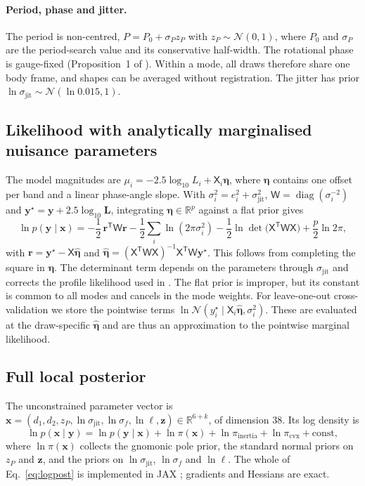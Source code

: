 \documentclass[11pt,a4paper]{article}
\theoremstyle{remark}
\newcommand{\vect}[1]{\bm{#1}}
\newcommand{\R}{\mathbb{R}}
\newcommand{\T}{^{\mathsf T}}
\DeclareMathOperator{\diag}{diag}
\begin{document}
\paragraph{Period, phase and jitter.} The period is non-centred, $P=P_0+\sigma_P z_P$ with
$z_P\sim\mathcal N(0,1)$, where $P_0$ and $\sigma_P$ are the period-search value and its conservative
half-width. The rotational phase is gauge-fixed (Proposition~1 of \citealp{lcinv_convex2026}). Within a
mode, all draws therefore share one body frame, and shapes can be averaged without registration. The
jitter has prior $\ln\sigma_{\mathrm{jit}}\sim\mathcal N(\ln0.015,1)$.

\subsection{Likelihood with analytically marginalised nuisance parameters}
\label{sec:likelihood}
The model magnitudes are $\mu_i=-2.5\log_{10}L_i+\mathsf X_i\vect\eta$, where $\vect\eta$ contains one
offset per band and a linear phase-angle slope. With $\sigma_i^2=e_i^2+\sigma_{\mathrm{jit}}^2$,
$\mathsf W=\diag(\sigma_i^{-2})$ and $\vect y^\star=\vect y+2.5\log_{10}\vect L$, integrating
$\vect\eta\in\R^p$ against a flat prior gives
\begin{equation}
  \ln p(\vect y\mid\vect x)=-\frac12\,\vect r\T\mathsf W\vect r-\frac12\sum_i\ln(2\pi\sigma_i^2)
  -\frac12\ln\det\bigl(\mathsf X\T\mathsf W\mathsf X\bigr)+\frac p2\ln2\pi,
  \label{eq:marglik}
\end{equation}
with $\vect r=\vect y^\star-\mathsf X\hat{\vect\eta}$ and
$\hat{\vect\eta}=(\mathsf X\T\mathsf W\mathsf X)^{-1}\mathsf X\T\mathsf W\vect y^\star$. This follows from
completing the square in $\vect\eta$. The determinant term depends on the parameters through
$\sigma_{\mathrm{jit}}$ and corrects the profile likelihood used in \citet{lcinv_convex2026}. The flat
prior is improper, but its constant is common to all modes and cancels in the mode weights. For
leave-one-out cross-validation we store the pointwise terms
$\ln\mathcal N(y_i^\star\mid\mathsf X_i\hat{\vect\eta},\sigma_i^2)$. These are evaluated at the
draw-specific $\hat{\vect\eta}$ and are thus an approximation to the pointwise marginal likelihood.

\subsection{Full local posterior}
The unconstrained parameter vector is
$\vect x=(d_1,d_2,z_P,\ln\sigma_{\mathrm{jit}},\ln\sigma_f,\ln\ell,\vect z)\in\R^{6+k}$, of dimension 38.
Its log density is
\begin{equation}
  \ln p(\vect x\mid\vect y)=\ln p(\vect y\mid\vect x)+\ln\pi(\vect x)+\ln\pi_{\mathrm{inertia}}+\ln\pi_{\mathrm{cvx}}+\text{const},
  \label{eq:logpost}
\end{equation}
where $\ln\pi(\vect x)$ collects the gnomonic pole prior, the standard normal priors on $z_P$ and
$\vect z$, and the priors on $\ln\sigma_{\mathrm{jit}}$, $\ln\sigma_f$ and $\ln\ell$. The whole of
Eq.~\eqref{eq:logpost} is implemented in JAX \citep{jax2018}; gradients and Hessians are exact.
\end{document}
